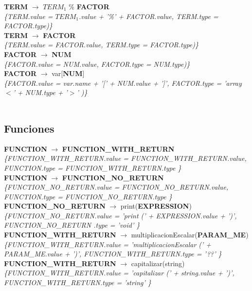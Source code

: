 \documentclass[10pt,a4paper]{article}
\begin{document}
\textbf{TERM} $\rightarrow$ \textbf{$TERM_{1}$} \% \textbf{FACTOR}  \\
\textit{\{TERM.value = $TERM_{1}$.value + '\%' + FACTOR.value, TERM.type = FACTOR.type)\}} \\

\textbf{TERM} $\rightarrow$ \textbf{FACTOR} \\
\textit{\{TERM.value = FACTOR.value, TERM.type = FACTOR.type)\}} \\

\textbf{FACTOR} $\rightarrow$ \textbf{NUM}   \\
\textit{\{FACTOR.value = NUM.value, FACTOR.type = NUM.type)\}} \\

\textbf{FACTOR} $\rightarrow$ var[\textbf{NUM}]  \\ 
\textit{\{FACTOR.value = var.name + '[' + NUM.value + ']', FACTOR.type = 'array$<$' + NUM.type + '$>$' )\}}  \\ 
\\

\subsection{Funciones}
\textbf{FUNCTION} $\rightarrow$ \textbf{FUNCTION\_WITH\_RETURN} \\
\textit{\{FUNCTION\_WITH\_RETURN.value =  FUNCTION\_WITH\_RETURN.value, FUNCTION.type = FUNCTION\_WITH\_RETURN.type \}} \\

\textbf{FUNCTION} $\rightarrow$ \textbf{FUNCTION\_NO\_RETURN} \\
\textit{\{FUNCTION\_NO\_RETURN.value =  FUNCTION\_NO\_RETURN.value, FUNCTION.type = FUNCTION\_NO\_RETURN.type \}} \\

\textbf{FUNCTION\_NO\_RETURN} $\rightarrow$ print(\textbf{EXPRESSION}) \\   
\textit{\{FUNCTION\_NO\_RETURN.value =  'print (' + EXPRESSION.value + ')', FUNCTION\_NO\_RETURN .type = 'void' \}} \\

\textbf{FUNCTION\_WITH\_RETURN} $\rightarrow$ multiplicacionEscalar(\textbf{PARAM\_ME}) \\ 
\textit{\{FUNCTION\_WITH\_RETURN.value =  'multiplicacionEscalar (' + PARAM\_ME.value + ')', FUNCTION\_WITH\_RETURN.type = '??' \}} \\

\textbf{FUNCTION\_WITH\_RETURN} $\rightarrow$ capitalizar(string)   \\
\textit{\{FUNCTION\_WITH\_RETURN.value =  'capitalizar (' + string.value + ')', FUNCTION\_WITH\_RETURN.type = 'string' \}} \\
\end{document}
